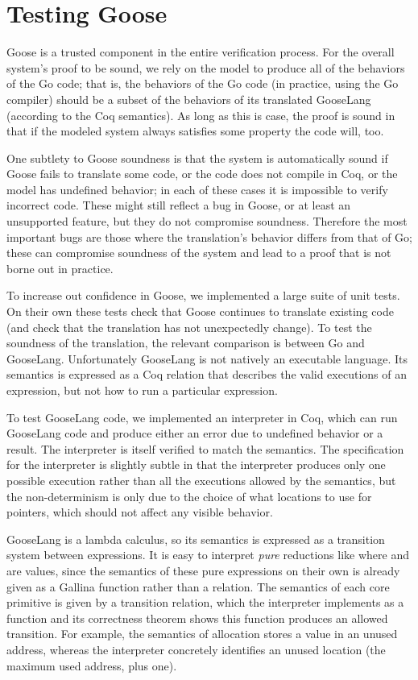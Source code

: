 \section{Testing Goose}%
\label{sec:goose:testing}

Goose is a trusted component in the entire verification process. For the
overall system's proof to be sound, we rely on the model to produce all
of the behaviors of the Go code; that is, the behaviors of the Go code
(in practice, using the Go compiler) should be a subset of the behaviors
of its translated GooseLang (according to the Coq semantics). As long as
this is case, the proof is sound in that if the modeled system always
satisfies some property the code will, too.

One subtlety to Goose soundness is that the system is automatically sound if
Goose fails to translate some code, or the code does not compile in Coq, or the
model has undefined behavior; in each of these cases it is impossible to verify
incorrect code. These might still reflect a bug in Goose, or at least an
unsupported feature, but they do not compromise soundness. Therefore the
most important bugs are those where the translation's behavior differs
from that of Go; these can compromise soundness of the system and lead
to a proof that is not borne out in practice.

To increase out confidence in Goose, we implemented a large suite of
unit tests. On their own these tests check that Goose continues to translate
existing code (and check that the translation has not unexpectedly
change). To test the soundness of the translation, the relevant comparison is
between Go and GooseLang. Unfortunately GooseLang is not natively an executable language.
Its semantics is expressed as a Coq relation that describes the valid executions
of an expression, but not how to run a particular expression.

To test GooseLang code, we implemented an interpreter in Coq, which can
run GooseLang code and produce either an error due to undefined behavior
or a result. The interpreter is itself
verified to match the semantics. The specification for the interpreter is slightly
subtle in that the interpreter produces only one possible execution rather than
all the executions allowed by the semantics, but
the non-determinism is only due to the choice of what locations to use
for pointers, which should not affect any visible behavior.

GooseLang is a lambda calculus, so
its semantics is expressed as a transition system between expressions.
It is easy to
interpret \emph{pure} reductions like  where 
and  are values, since the semantics of these pure expressions on their own
is already given as a Gallina function rather than a relation. The semantics of each core primitive is
given by a transition relation, which the interpreter implements as a function
and its correctness theorem shows this function produces an allowed transition.
For example, the semantics of allocation stores a value in an unused address,
whereas the interpreter concretely identifies an unused location (the maximum
used address, plus one).


